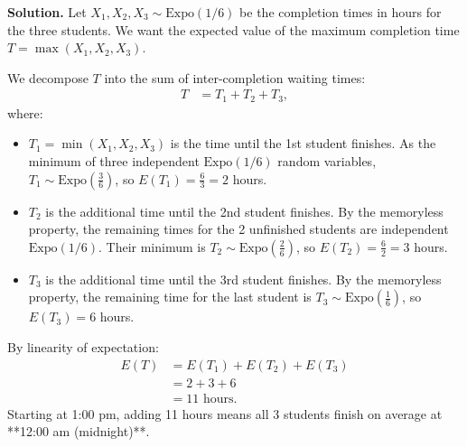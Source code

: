 \documentclass[11pt,a4paper]{article}
\begin{document}
\noindent \textbf{Solution.} Let $X_1, X_2, X_3 \sim \text{Expo}(1/6)$ be the completion times in hours for the three students. We want the expected value of the maximum completion time $T = \max(X_1, X_2, X_3)$.

We decompose $T$ into the sum of inter-completion waiting times:
\begin{align*}
T &= T_1 + T_2 + T_3,
\end{align*}
where:
\begin{itemize}
    \item $T_1 = \min(X_1, X_2, X_3)$ is the time until the 1st student finishes. As the minimum of three independent $\text{Expo}(1/6)$ random variables, $T_1 \sim \text{Expo}\left(\frac{3}{6}\right)$, so $E(T_1) = \frac{6}{3} = 2$ hours.
    \item $T_2$ is the additional time until the 2nd student finishes. By the memoryless property, the remaining times for the 2 unfinished students are independent $\text{Expo}(1/6)$. Their minimum is $T_2 \sim \text{Expo}\left(\frac{2}{6}\right)$, so $E(T_2) = \frac{6}{2} = 3$ hours.
    \item $T_3$ is the additional time until the 3rd student finishes. By the memoryless property, the remaining time for the last student is $T_3 \sim \text{Expo}\left(\frac{1}{6}\right)$, so $E(T_3) = 6$ hours.
\end{itemize}
By linearity of expectation:
\begin{align*}
E(T) &= E(T_1) + E(T_2) + E(T_3) \\
&= 2 + 3 + 6 \\
&= 11 \text{ hours}.
\end{align*}
Starting at 1:00 pm, adding 11 hours means all 3 students finish on average at **12:00 am (midnight)**.

\vspace{10pt}
\end{document}

